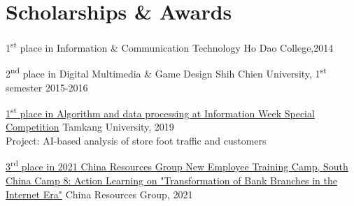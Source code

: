 \section{Scholarships \& Awards}

\begin{detaillist}

\item 1\textsuperscript{st} place in Information \& Communication Technology \hfill Ho Dao College,2014

\item 2\textsuperscript{nd} place in Digital Multimedia \& Game Design \hfill Shih Chien University, 1\textsuperscript{st} semester 2015-2016

\item \href{http://aiit.csie.tku.edu.tw/reward/inside/2019ITShow/9.html}{1\textsuperscript{st} place in Algorithm and data processing at Information Week Special Competition} \hfill Tamkang University, 2019\\
Project: AI-based analysis of store foot traffic and customers

\item \href{https://mp.weixin.qq.com/s/45NlbMGvLXlcKZxvWkTHOw}{3\textsuperscript{rd} place in 2021 China Resources Group New Employee Training Camp, South China Camp 8: Action Learning on "Transformation of Bank Branches in the Internet Era"} \hfill China Resources Group, 2021

\end{detaillist}
